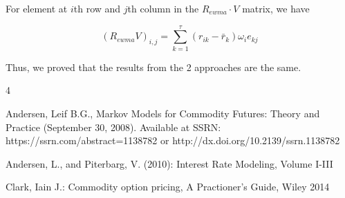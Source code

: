 \documentclass{amsart}
\theoremstyle{plain}
\numberwithin{equation}{section}
\begin{document}
For element at $i$th row and $j$th column in the $R_{ewma}\cdot V$ matrix, we have

\begin{equation}
(R_{ewma} V)_{i,j} = \sum_{k=1}^\tau (r_{ik}-\bar{r}_k)\omega_i e_{kj}
\end{equation}

Thus, we proved that the results from the 2 approaches are the same.


\begin{thebibliography}{4}
  

Andersen, Leif B.G., Markov Models for Commodity Futures: Theory and Practice (September 30, 2008). Available at SSRN: https://ssrn.com/abstract=1138782 or http://dx.doi.org/10.2139/ssrn.1138782

 Andersen, L., and Piterbarg, V. (2010): Interest Rate Modeling, Volume I-III

Clark, Iain J.: Commodity option pricing, A Practioner's Guide, Wiley 2014
  
\end{thebibliography}
\end{document}
